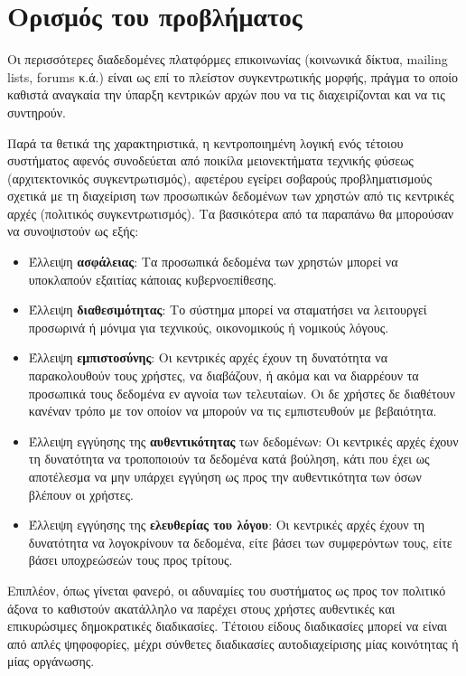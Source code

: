\section{Ορισμός του προβλήματος}\label{section:1-3-problem-definition}

Οι περισσότερες διαδεδομένες πλατφόρμες επικοινωνίας (κοινωνικά δίκτυα, mailing lists, forums κ.ά.) είναι ως επί το πλείστον συγκεντρωτικής μορφής, πράγμα το οποίο καθιστά αναγκαία την ύπαρξη κεντρικών αρχών που να τις διαχειρίζονται και να τις συντηρούν. 

Παρά τα θετικά της χαρακτηριστικά, η κεντροποιημένη λογική ενός τέτοιου συστήματος αφενός συνοδεύεται από ποικίλα μειονεκτήματα τεχνικής φύσεως (αρχιτεκτονικός συγκεντρωτισμός), αφετέρου εγείρει σοβαρούς προβληματισμούς σχετικά με τη διαχείριση των προσωπικών δεδομένων των χρηστών από τις κεντρικές αρχές (πολιτικός συγκεντρωτισμός). Τα βασικότερα από τα παραπάνω θα μπορούσαν να συνοψιστούν ως εξής: 

\begin{itemize}
	\item Έλλειψη \textbf{ασφάλειας}: Τα προσωπικά δεδομένα των χρηστών μπορεί να υποκλαπούν εξαιτίας κάποιας κυβερνοεπίθεσης.
	\item Έλλειψη \textbf{διαθεσιμότητας}: Το σύστημα μπορεί να σταματήσει να λειτουργεί προσωρινά ή μόνιμα για τεχνικούς, οικονομικούς ή νομικούς λόγους.
	\item Έλλειψη \textbf{εμπιστοσύνης}: Οι κεντρικές αρχές έχουν τη δυνατότητα να παρακολουθούν τους χρήστες, να διαβάζουν, ή ακόμα και να διαρρέουν τα προσωπικά τους δεδομένα εν αγνοία των τελευταίων. Οι δε χρήστες δε διαθέτουν κανέναν τρόπο με τον οποίον να μπορούν να τις εμπιστευθούν με βεβαιότητα.
	\item Έλλειψη εγγύησης της \textbf{αυθεντικότητας} των δεδομένων: Οι κεντρικές αρχές έχουν τη δυνατότητα να τροποποιούν τα δεδομένα κατά βούληση, κάτι που έχει ως αποτέλεσμα να μην υπάρχει εγγύηση ως προς την αυθεντικότητα των όσων βλέπουν οι χρήστες.
	\item Έλλειψη εγγύησης της \textbf{ελευθερίας του λόγου}: Οι κεντρικές αρχές έχουν τη δυνατότητα να λογοκρίνουν τα δεδομένα, είτε βάσει των συμφερόντων τους, είτε βάσει υποχρεώσεών τους προς τρίτους.
\end{itemize}

Επιπλέον, όπως γίνεται φανερό, οι αδυναμίες του συστήματος ως προς τον πολιτικό άξονα το καθιστούν ακατάλληλο να παρέχει στους χρήστες αυθεντικές και επικυρώσιμες δημοκρατικές διαδικασίες. Τέτοιου είδους διαδικασίες μπορεί να είναι από απλές ψηφοφορίες, μέχρι σύνθετες διαδικασίες αυτοδιαχείρισης μίας κοινότητας ή μίας οργάνωσης.